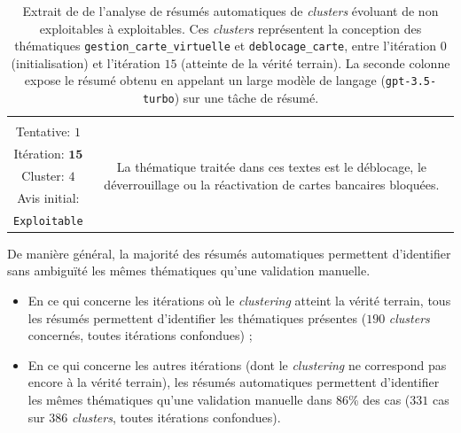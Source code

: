 \begin{table}[!htb]
\begin{center}
\begin{tabular}{|c|c|}
				{ \footnotesize \dotfill }
					& { \footnotesize \dotfill }
					\tabularnewline
					
				{ \footnotesize Tentative: $1$ }
					& \multirow{5}{*}{\parbox{12cm}{
						\footnotesize La thématique traitée dans ces textes est le déblocage, le déverrouillage ou la réactivation de cartes bancaires bloquées.
					}}
					\tabularnewline
				{ \footnotesize Itération: $\textbf{15}$ }
					&
					\tabularnewline
				{ \footnotesize Cluster: $4$ }
					&
					\tabularnewline
				{ \footnotesize Avis initial: }
					&
					\tabularnewline
				{ \footnotesize \color{colorDarkPastelGreen} \texttt{Exploitable} }
					&
					\tabularnewline
					\hline
					
				\end{tabular}
				\end{center}
				\caption{
					Extrait de de l'analyse de résumés automatiques de \textit{clusters} évoluant de non exploitables à exploitables.
					Ces \textit{clusters} représentent la conception des thématiques \texttt{gestion\_carte\_virtuelle} et \texttt{deblocage\_carte}, entre l'itération $0$ (initialisation) et l'itération $15$ (atteinte de la vérité terrain).
					La seconde colonne expose le résumé obtenu en appelant un large modèle de langage (\texttt{gpt-3.5-turbo}) sur une tâche de résumé.
				}
				\label{table:4.4.3-ETUDE-PERTINENCE-RESUME-AUTOMATIQUE-DEBLOCAGE-CARTE-GESTION-CARTE-VIRTUELLE}
			\end{table}
			
			De manière général, la majorité des résumés automatiques permettent d'identifier sans ambiguïté les mêmes thématiques qu'une validation manuelle.
			\begin{itemize}
				\item En ce qui concerne les itérations où le \textit{clustering} atteint la vérité terrain, tous les résumés permettent d'identifier les thématiques présentes ($190$ \textit{clusters} concernés, toutes itérations confondues) ;
				\item En ce qui concerne les autres itérations (dont le \textit{clustering} ne correspond pas encore à la vérité terrain), les résumés automatiques permettent d'identifier les mêmes thématiques qu'une validation manuelle dans $86$\% des cas ($331$ cas sur $386$ \textit{clusters}, toutes itérations confondues).
			\end{itemize}
			

